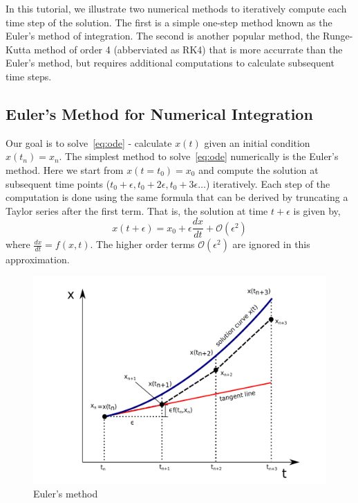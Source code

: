 \documentclass[10pt,letterpaper]{article}
\begin{document}
In this tutorial, we illustrate two numerical methods to iteratively compute each time step of the solution. The first is a simple one-step method known as the Euler's method of integration. The second is another popular method, the Runge-Kutta method of order 4 (abberviated as RK4) that is more accurrate than the Euler's method, but requires additional computations to calculate subsequent time steps. 

\subsection*{Euler's Method for Numerical Integration}
Our goal is to solve~\ref{eq:ode} - calculate $x(t)$ given an initial condition $x(t_n)=x_{n}$. The simplest method to solve~\ref{eq:ode} numerically is the Euler's method. Here we start from $x(t=t_{0})=x_{0}$ and compute the solution at subsequent time points ($t_{0}+\epsilon,t_{0}+2\epsilon,t_{0}+3\epsilon \dots $) iteratively. Each step of the computation is done using the same formula that can be derived by truncating a Taylor series after the first term. That is, the solution at time $t+\epsilon$ is given by,
\begin{equation}
x(t+\epsilon) = x_{0} + \epsilon\frac{dx}{dt} + \mathcal{O}(\epsilon^2)
\label{eq:euler}
\end{equation}
where $\frac{dx}{dt}=f(x,t)$. The higher order terms $\mathcal{O}(\epsilon^2)$ are ignored in this approximation. 

\begin{figure}[H]
\includegraphics[scale=0.4]{Figures/fig1.pdf} 
\caption{Euler's method}
\label{fig:euler}
\end{figure}
\end{document}
